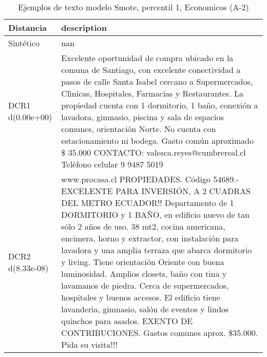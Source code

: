\begin{table}[H]
\centering
\fontsize{10}{14}\selectfont
\caption{Ejemplos de texto modelo Smote, percentil 1, Economicos (A-2)}
\label{table-example-economicos-a-2-smote-enc-1p-text}
\begin{tabular}{|l|m{35em}|}
\hline
\rowcolor[gray]{0.8}
Distancia & description \\
\hline Sintético & nan \\
\hline DCR1 d(0.00e+00) & Excelente oportunidad de compra ubicado en la comuna de Santiago, con excelente conectividad a pasos de calle Santa Isabel cercano a Supermercados, Cl{\'\i}nicas, Hospitales, Farmacias y Restaurantes. La propiedad cuenta con 1 dormitorio, 1 ba\~no, conexi\'on a lavadora, gimnasio, piscina y sala de espacios comunes, orientaci\'on Norte.
 No cuenta con estacionamiento ni bodega. Gasto com\'un aproximado \$ 35.000 CONTACTO: valesca.reyes@cumbrereal.cl Tel\'efono celular 9 9487 5019 \\
\hline DCR2 d(8.33e-08) & www.procasa.cl    PROPIEDADES. C\'odigo 54689.- EXCELENTE PARA INVERSI\'ON, A 2 CUADRAS DEL METRO ECUADOR!! Departamento de 1 DORMITORIO y 1 BA\~NO, en edificio nuevo de tan s\'olo 2 a\~nos de uso. 38 mt2, cocina americana, encimera, horno y extractor, con instalaci\'on para lavadora y una amplia terraza que abarca dormitorio y living. Tiene orientaci\'on Oriente con buena luminosidad. Amplios closets, ba\~no con tina y lavamanos de piedra. Cerca de supermercados, hospitales y buenos accesos. El edificio tiene lavander{\'\i}a, gimnasio, sal\'on de eventos y lindos quinchos para asados.   EXENTO DE CONTRIBUCIONES. Gastos comunes aprox. \$35.000.  Pida su visita!!! \\
\hline
\end{tabular}
\end{table}
